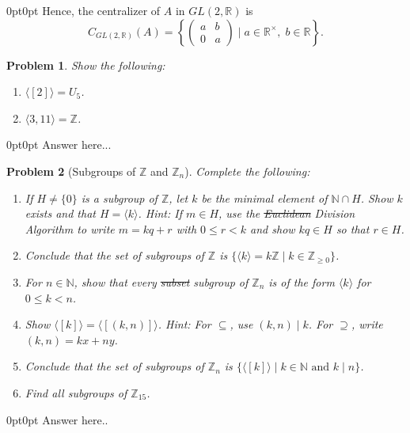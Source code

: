 \documentclass[12pt]{article}
\newtheorem{problem}{Problem}
\numberwithin{problem}{section} %
\theoremstyle{remark}  %
\newenvironment{answer}
    {\begin{adjustwidth}{0pt}{0pt}}
    {\end{adjustwidth}}
\begin{document}
\begin{answer}
        Hence, the centralizer of \(A\) in \(GL(2,\mathbb{R})\) is
        \[
        C_{GL(2,\mathbb{R})}(A)=\left\{\begin{pmatrix} a & b \\ 0 & a \end{pmatrix} \mid a\in \mathbb{R}^\times,\; b\in \mathbb{R}\right\}.
        \]
        \end{answer}
        
    \begin{problem}
        Show the following:
        \begin{enumerate}[label=(\alph*)]
            \item $\langle[2]\rangle=U_5$.
            \item $\langle 3,11 \rangle = \mathbb{Z}$.
        \end{enumerate}
    \end{problem}
    \begin{answer}
        Answer here...
    \end{answer}
\setcounter{problem}{62}
    \begin{problem}[Subgroups of $\mathbb{Z}$ and $\mathbb{Z}_n$] 
        Complete the following:
        \begin{enumerate}[label=(\alph*)]
            \item If $H\neq\{0\}$ is a subgroup of $\mathbb{Z}$, let $k$ be the minimal element of $\mathbb{N}\cap H$. Show $k$ exists and that $H=\langle k\rangle$. Hint: If $m\in H$, use the \st{Euclidean} Division Algorithm to write $m=kq+r$ with $0\leq r < k$ and show $kq\in H$ so that $r \in H$.
            \item Conclude that the set of subgroups of $\mathbb{Z}$ is $\{\langle k\rangle=k\mathbb{Z} \mid k\in\mathbb{Z}_{\geq 0}\}$.
            \item For $n\in \mathbb{N}$, show that every \st{subset} subgroup of $\mathbb{Z}_n$ is of the form $\langle k \rangle$ for $0 \leq k < n$.
            \item Show $\langle [k] \rangle = \langle [(k,n)] \rangle$. Hint: For $\subseteq$, use $(k,n)\operatorname{\mid} k$. For $\supseteq$, write $(k,n)=kx+ny$.
            \item Conclude that the set of subgroups of $\mathbb{Z}_n$ is $\{\langle [k] \rangle \mid k \in \mathbb{N}\text{ and } k\mid n\}$.
            \item Find all subgroups of $\mathbb{Z}_{15}$.
        \end{enumerate}
    \end{problem}
    \begin{answer}
        Answer here..
    \end{answer}
\end{document}
